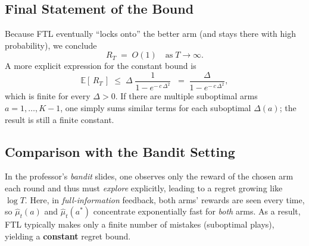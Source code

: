 \subsection*{Final Statement of the Bound}

Because FTL eventually ``locks onto'' the better arm (and stays there with high probability), we conclude
\[
  R_T
  \;=\;
  O(1)
  \quad\text{as}\;T\to\infty.
\]
A more explicit expression for the constant bound is
\[
  \mathbb{E}[\,R_T\,]
  \;\le\;
  \Delta
  \;\frac{1}{1 - e^{-\,c\,\Delta^2}}
  \;\;=\;
  \frac{\Delta}{1 - e^{-\,c\,\Delta^2}},
\]
which is finite for every $\Delta>0$.  If there are multiple suboptimal arms $a=1,\dots,K-1$, one simply sums similar terms for each suboptimal $\Delta(a)$; the result is still a finite constant.

\subsection*{Comparison with the Bandit Setting}

In the professor's \emph{bandit} slides, one observes only the reward of the chosen arm each round and thus must \emph{explore} explicitly, leading to a regret growing like $\log T$.  Here, in \emph{full-information} feedback, both arms' rewards are seen every time, so $\hat{\mu}_t(a)$ and $\hat{\mu}_t(a^*)$ concentrate exponentially fast for \emph{both} arms.  As a result, FTL typically makes only a finite number of mistakes (suboptimal plays), yielding a \textbf{constant} regret bound.


